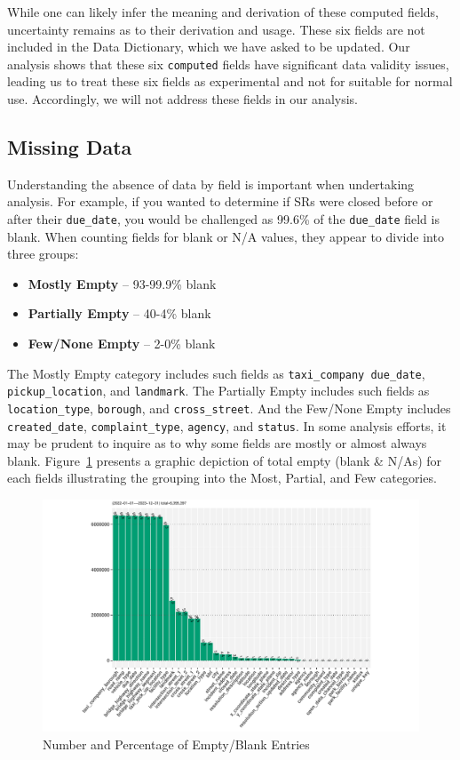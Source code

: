 \documentclass[linenumber]{jdsart}
\begin{document}
While one can likely infer the meaning and 
derivation of these computed fields, uncertainty remains as to
their derivation and usage. These six fields are not included in
the Data Dictionary, which we have asked to be updated. Our 
analysis shows that these six \texttt{computed} fields have 
significant data validity issues, leading us to treat these six fields 
as experimental and not for suitable for normal use. Accordingly, 
we will not address these fields in our analysis.


\subsection{Missing Data}
\label{sec:blanks}
Understanding the absence of data by field is important 
when undertaking analysis. For example, if you wanted to 
determine if SRs were closed before or after their
\texttt{due\_date}, you would be challenged as 99.6\% of the
\texttt{due\_date} field is blank. When counting fields for 
blank or N/A values, they appear to divide into three groups:

\begin{itemize}
    \item \textbf{Mostly Empty} -- 93-99.9\% blank 
    \item \textbf{Partially Empty} -- 40-4\% blank
    \item \textbf{Few/None Empty} -- 2-0\% blank
\end{itemize}


The Mostly Empty category includes such fields as
\texttt{taxi\_company due\_date},
\texttt{pickup\_location}, and \texttt{landmark}.
The Partially Empty includes such fields as
\texttt{location\_type}, \texttt{borough}, 
and \texttt{cross\_street}. And the Few/None Empty includes
\texttt{created\_date}, \texttt{complaint\_type},
\texttt{agency}, and \texttt{status}. In some analysis efforts, it may be
prudent to inquire as to why some fields are mostly or almost always blank.
Figure~\ref{fig:blank_fields} presents a graphic 
depiction of total empty (blank \& N/As) for each fields illustrating
the grouping into the Most, Partial, and Few categories.


\begin{figure}[tbp]
	\centering
  	\includegraphics[width=\textwidth]{BlankFields.pdf}
	\caption{Number and Percentage of Empty/Blank Entries}
	\label{fig:blank_fields}
\end{figure}
\end{document}
